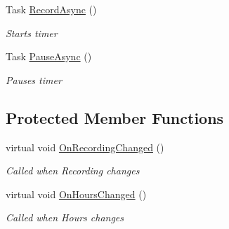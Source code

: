 \begin{DoxyCompactItemize}
Task \hyperlink{class_field_service_1_1_view_models_1_1_assignment_view_model_acbb68867f8c73a3bd5f2314a61faaf72}{Record\+Async} ()
\begin{DoxyCompactList}\small\item\em Starts timer \end{DoxyCompactList}\item 
Task \hyperlink{class_field_service_1_1_view_models_1_1_assignment_view_model_a7fb4d1dd3b7f6ffb6e0d99dc3a9b738b}{Pause\+Async} ()
\begin{DoxyCompactList}\small\item\em Pauses timer \end{DoxyCompactList}\end{DoxyCompactItemize}
\subsection*{Protected Member Functions}
\begin{DoxyCompactItemize}
\item 
virtual void \hyperlink{class_field_service_1_1_view_models_1_1_assignment_view_model_a9305af75c7777c8e9955b9f8326ed5ce}{On\+Recording\+Changed} ()
\begin{DoxyCompactList}\small\item\em Called when Recording changes \end{DoxyCompactList}\item 
virtual void \hyperlink{class_field_service_1_1_view_models_1_1_assignment_view_model_a714185393fd4448a94bbcafc3a2c9638}{On\+Hours\+Changed} ()
\begin{DoxyCompactList}\small\item\em Called when Hours changes \end{DoxyCompactList}\end{DoxyCompactItemize}
